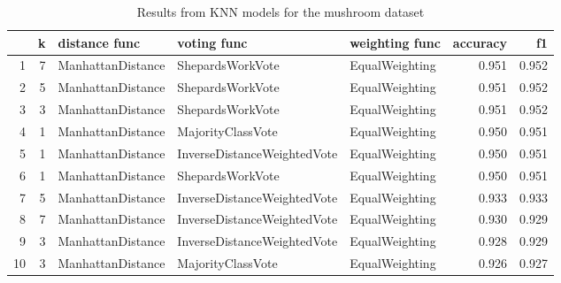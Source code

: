 \begin{table}
\centering
\caption{Results from KNN models for the mushroom dataset}
\label{tab:knn_results_mushroom}
\begin{tabular}{rrlllrr}
\toprule
 & k & distance func & voting func & weighting func & accuracy & f1 \\
\midrule
1 & 7 & ManhattanDistance & ShepardsWorkVote & EqualWeighting & 0.951 & 0.952 \\
2 & 5 & ManhattanDistance & ShepardsWorkVote & EqualWeighting & 0.951 & 0.952 \\
3 & 3 & ManhattanDistance & ShepardsWorkVote & EqualWeighting & 0.951 & 0.952 \\
4 & 1 & ManhattanDistance & MajorityClassVote & EqualWeighting & 0.950 & 0.951 \\
5 & 1 & ManhattanDistance & InverseDistanceWeightedVote & EqualWeighting & 0.950 & 0.951 \\
6 & 1 & ManhattanDistance & ShepardsWorkVote & EqualWeighting & 0.950 & 0.951 \\
7 & 5 & ManhattanDistance & InverseDistanceWeightedVote & EqualWeighting & 0.933 & 0.933 \\
8 & 7 & ManhattanDistance & InverseDistanceWeightedVote & EqualWeighting & 0.930 & 0.929 \\
9 & 3 & ManhattanDistance & InverseDistanceWeightedVote & EqualWeighting & 0.928 & 0.929 \\
10 & 3 & ManhattanDistance & MajorityClassVote & EqualWeighting & 0.926 & 0.927 \\
\bottomrule
\end{tabular}
\end{table}
